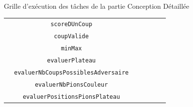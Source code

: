 \documentclass{beamer}
\renewcommand{\tt}[1]{\texttt{#1}}
\begin{document}
\begin{frame}[label=cd]
\begin{alertblock}{Grille d’exécution des tâches de la partie \og Conception Détaillée \fg}
{\begin{table}[h]
\begin{center}
\begin{tabular}{|c|c|c|c|c|c|c|}
				 & \tt{scoreDUnCoup} & \cellcolor{lightgray} & &\cellcolor{lightgray} & & \\\cline{2-7}
				 & \tt{coupValide} &  & &  & \cellcolor{lightgray} & \\\cline{2-7}
				 & \tt{minMax} & \cellcolor{lightgray} & &\cellcolor{lightgray} & & \\ \cline{2-7}
				 & \tt{evaluerPlateau} &  & &  & \cellcolor{lightgray} & \\\cline{2-7}
				 & \tt{evaluerNbCoupsPossiblesAdversaire} &  & &  & \cellcolor{lightgray} & \\\cline{2-7}
				 & \tt{evaluerNbPionsCouleur} &  & &  & \cellcolor{lightgray} & \\\cline{2-7}
				 & \tt{evaluerPositionsPionsPlateau} &  & &  & \cellcolor{lightgray} & \\\hline
\end{tabular}
\end{center}
\end{table} }

	\end{alertblock}
	\end{frame}
	
\end{document}
